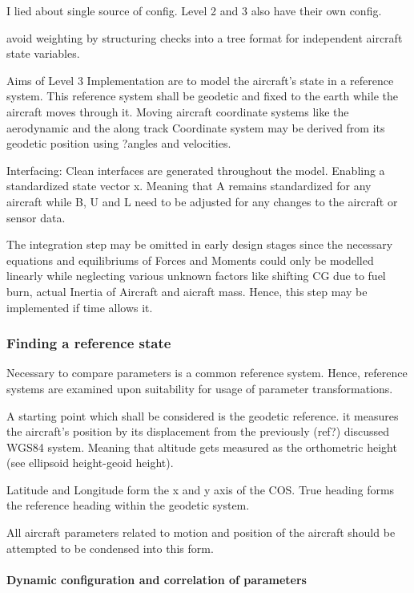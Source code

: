 I lied about single source of config. Level 2 and 3 also have their own config.

avoid weighting by structuring checks into a tree format for independent aircraft state variables.


Aims of Level 3 Implementation are to model the aircraft's state in a reference system.
This reference system shall be geodetic and fixed to the earth while the aircraft moves through it. Moving aircraft coordinate systems like the aerodynamic and the along track Coordinate system may be derived from its geodetic position using ?angles and velocities.


Interfacing: Clean interfaces are generated throughout the model. Enabling a standardized state vector x. Meaning that A remains standardized for any aircraft while B, U and L need to be adjusted for any changes to the aircraft or sensor data.

The integration step may be omitted in early design stages since the necessary equations and equilibriums of Forces and Moments could only be modelled linearly while neglecting various unknown factors like shifting CG due to fuel burn, actual Inertia of Aircraft and aicraft mass. Hence, this step may be implemented if time allows it.

\subsubsection{Finding a reference state}

Necessary to compare parameters is a common reference system. Hence, reference systems are examined upon suitability for usage of parameter transformations.

A starting point which shall be considered is the geodetic reference.
it measures the aircraft's position by its displacement from the previously (ref?) discussed WGS84 system.
Meaning that altitude gets measured as the orthometric height (see ellipsoid height-geoid height).

Latitude and Longitude form the x and y axis of the COS. True heading forms the reference heading within the geodetic system.

All aircraft parameters related to motion and position of the aircraft should be attempted to be condensed into this form.

\paragraph{Dynamic configuration and correlation of parameters}

